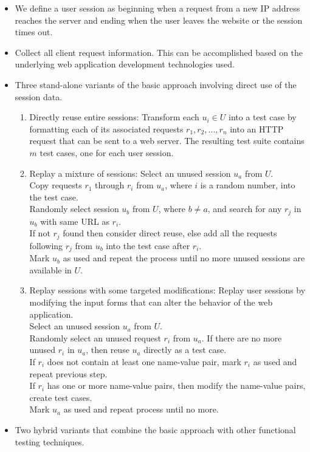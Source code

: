 \documentclass[a4paper]{article}
\begin{document}
\begin{itemize}
    \item We define a user session as beginning when a request from a new IP address reaches the server and ending when the user leaves the website or the session times out.
    \item Collect all client request information. This can be accomplished based on the underlying web application development technologies used.
    \item Three stand-alone variants of the basic approach involving direct use of the session data.
    \begin{enumerate}
        \item Directly reuse entire sessions: Transform each $u_i\in U$ into a test case by formatting each of its associated requests $r_1,r_2,...,r_n$ into an HTTP request that can be sent to a web server. The resulting test suite contains $m$ test cases, one for each user session.
        \item Replay a mixture of sessions: Select an unused session $u_a$ from $U$.\\
        Copy requests $r_1$ through $r_i$ from $u_a$, where $i$ is a random number, into the test case.\\
        Randomly select session $u_b$ from $U$, where $b\neq a$, and search for any $r_j$ in $u_b$ with same URL as $r_i$.\\
        If not $r_j$ found then consider direct reuse, else add all the requests following $r_j$ from $u_b$ into the test case after $r_i$.\\
        Mark $u_b$ as used and repeat the process until no more unused sessions are available in $U$.
        \item Replay sessions with some targeted modifications: Replay user sessions by modifying the input forms that can alter the behavior of the web application.\\
        Select an unused session $u_a$ from $U$.\\
        Randomly select an unused request $r_i$ from $u_a$. If there are no more unused $r_i$ in $u_a$, then reuse $u_a$ directly as a test case.\\
        If $r_i$ does not contain at least one name-value pair, mark $r_i$ as used and repeat previous step.\\
        If $r_i$ has one or more name-value pairs, then modify the name-value pairs, create test cases.\\
        Mark $u_a$ as used and repeat process until no more.
    \end{enumerate}
    \item Two hybrid variants that combine the basic approach with other functional testing techniques.
\end{itemize}
\end{document}
